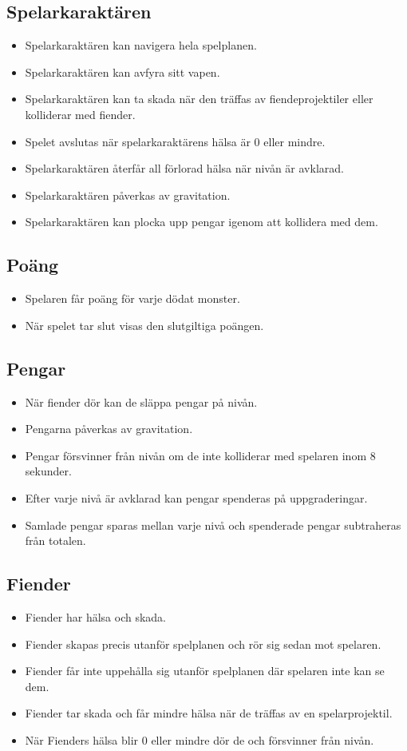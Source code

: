 \documentclass{TDP005mall}
\begin{document}
\subsection{Spelarkaraktären}
\begin{itemize}
\item Spelarkaraktären kan navigera hela spelplanen.
\item Spelarkaraktären kan avfyra sitt vapen.
\item Spelarkaraktären kan ta skada när den träffas av fiendeprojektiler eller kolliderar med fiender.
\item Spelet avslutas när spelarkaraktärens hälsa är 0 eller mindre.
\item Spelarkaraktären återfår all förlorad hälsa när nivån är avklarad.
\item Spelarkaraktären påverkas av gravitation.
\item Spelarkaraktären kan plocka upp pengar igenom att kollidera med dem.
\end{itemize}

\subsection{Poäng}
\begin{itemize}
\item Spelaren får poäng för varje dödat monster.
\item När spelet tar slut visas den slutgiltiga poängen.
\end{itemize}

\subsection{Pengar}
\begin{itemize}
\item När fiender dör kan de släppa pengar på nivån.
\item Pengarna påverkas av gravitation.
\item Pengar försvinner från nivån om de inte kolliderar med spelaren inom 8 sekunder.
\item Efter varje nivå är avklarad kan pengar spenderas på uppgraderingar.
\item Samlade pengar sparas mellan varje nivå och spenderade pengar subtraheras från totalen. 
\end{itemize}

\subsection{Fiender}
\begin{itemize}
\item Fiender har hälsa och skada.
\item Fiender skapas precis utanför spelplanen och rör sig sedan mot spelaren.
\item Fiender får inte uppehålla sig utanför spelplanen där spelaren inte kan se dem.
\item Fiender tar skada och får mindre hälsa när de träffas av en spelarprojektil.
\item När Fienders hälsa blir 0 eller mindre dör de och försvinner från nivån.
\end{itemize}
\end{document}
